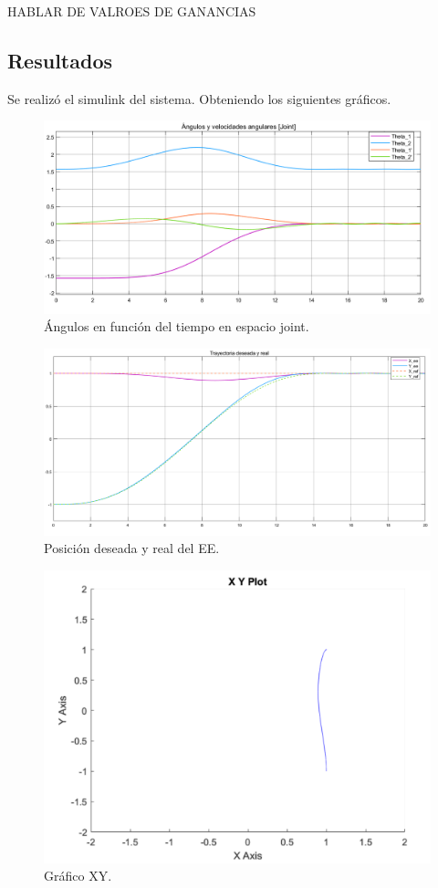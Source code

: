 HABLAR DE VALROES DE GANANCIAS

\subsection{Resultados}
Se realiz\'o el simulink del sistema. Obteniendo los siguientes gr\'aficos.

\begin{figure}[H]
	\centering
	\includegraphics[width=0.8\linewidth]{ImagenesControl de posición no lineal/1_3_a}
	\caption{\'Angulos en funci\'on del tiempo en espacio joint.}	
	\label{fig:athetas}
\end{figure}

\begin{figure}[H]
	\centering
	\includegraphics[width=0.8\linewidth]{ImagenesControl de posición no lineal/1_3_b}
	\caption{Posici\'on deseada y real del EE.}	
	\label{fig:apos}
\end{figure}
\begin{figure}[H]
	\centering
	\includegraphics[width=0.5\linewidth]{ImagenesControl de posición no lineal/1_3_c}
	\caption{Gr\'afico XY.}	
	\label{fig:axy}
\end{figure}

